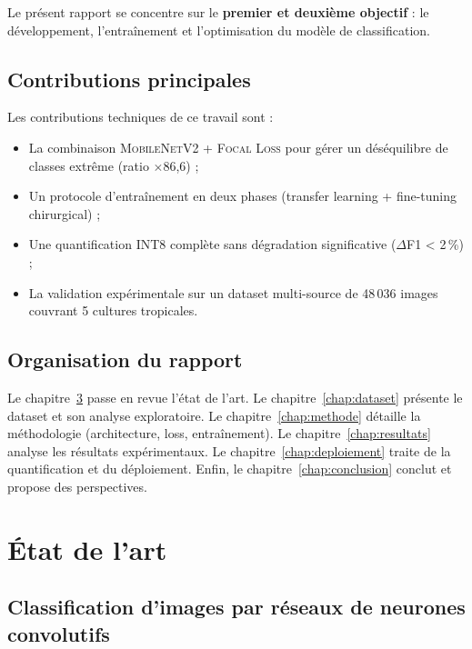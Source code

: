 \documentclass[12pt, a4paper, twoside]{report}
\newcommand{\focal}{\textsc{Focal Loss}}
\newcommand{\mobilenet}{\textsc{MobileNetV2}}
\begin{document}
Le présent rapport se concentre sur le \textbf{premier et deuxième objectif} : le développement, l'entraînement et l'optimisation du modèle de classification.

\section{Contributions principales}

Les contributions techniques de ce travail sont :
\begin{itemize}
    \item La combinaison \mobilenet{} + \focal{} pour gérer un déséquilibre de classes extrême (ratio $\times$86,6) ;
    \item Un protocole d'entraînement en deux phases (transfer learning + fine-tuning chirurgical) ;
    \item Une quantification INT8 complète sans dégradation significative ($\Delta$F1 < 2\,\%) ;
    \item La validation expérimentale sur un dataset multi-source de 48\,036 images couvrant 5 cultures tropicales.
\end{itemize}

\section{Organisation du rapport}

Le chapitre~\ref{chap:etat-art} passe en revue l'état de l'art. Le chapitre~\ref{chap:dataset} présente le dataset et son analyse exploratoire. Le chapitre~\ref{chap:methode} détaille la méthodologie (architecture, loss, entraînement). Le chapitre~\ref{chap:resultats} analyse les résultats expérimentaux. Le chapitre~\ref{chap:deploiement} traite de la quantification et du déploiement. Enfin, le chapitre~\ref{chap:conclusion} conclut et propose des perspectives.


\chapter{État de l'art}
\label{chap:etat-art}

\section{Classification d'images par réseaux de neurones convolutifs}
\end{document}
